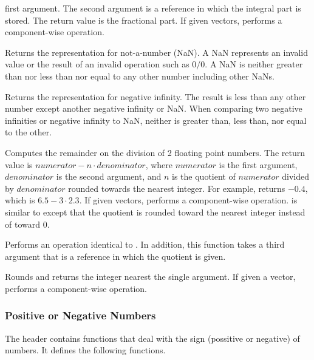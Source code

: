 \begin{description}
  first argument. The second argument is a reference in which the integral
  part is stored. The return value is the fractional part. If given
  vectors,  performs a component-wise operation.
\item[\daxmath{Nan}]  Returns the 
  representation for not-a-number (NaN). A NaN represents an invalid value
  or the result of an invalid operation such as $0/0$. A NaN is neither
  greater than nor less than nor equal to any other number including other
  NaNs.
\item[\daxmath{NegativeInfinity}] Returns the  representation
  for negative infinity. The result is less than any other number except
  another negative infinity or NaN. When comparing two negative infinities
  or negative infinity to NaN, neither is greater than, less than, nor
  equal to the other.
\item[\daxmath{Remainder}]  Computes the remainder on the
  division of 2 floating point numbers. The return value is $numerator - n
  \cdot denominator$, where $numerator$ is the first argument,
  $denominator$ is the second argument, and $n$ is the quotient of
  $numerator$ divided by $denominator$ rounded towards the nearest
  integer. For example,  returns
  $-0.4$, which is $6.5 - 3\cdot2.3$. If given vectors,
   performs a component-wise
  operation.  is similar to 
  except that the quotient is rounded toward the nearest integer instead of
  toward 0.
\item[\daxmath{RemainderQuotient}] Performs an operation identical to
  . In addition, this function takes a third
  argument that is a reference in which the quotient is given.
\item[\daxmath{Round}] Rounds and returns the integer nearest the single
  argument. If given a vector, performs a component-wise operation.
\end{description}

\subsubsection{Positive or Negative Numbers}

The  header contains functions that deal with
the sign (possitive or negative) of numbers. It defines the following
functions.

